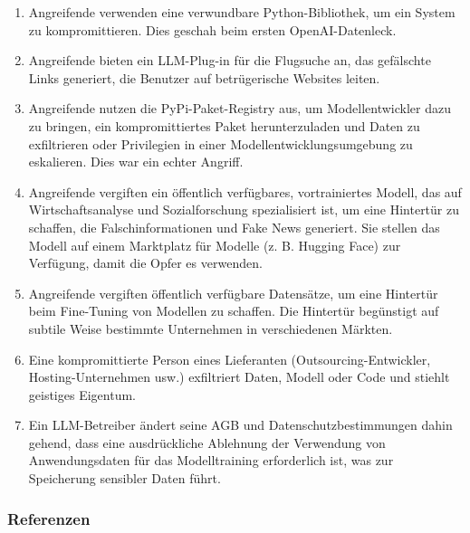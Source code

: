 \documentclass[
]{article}
\providecommand{\tightlist}{%
  \setlength{\itemsep}{0pt}\setlength{\parskip}{0pt}}
\begin{document}
\begin{enumerate}
\def\labelenumi{\arabic{enumi}.}
\tightlist
\item
  Angreifende verwenden eine verwundbare Python-Bibliothek, um ein
  System zu kompromittieren. Dies geschah beim ersten OpenAI-Datenleck.
\item
  Angreifende bieten ein LLM-Plug-in für die Flugsuche an, das
  gefälschte Links generiert, die Benutzer auf betrügerische Websites
  leiten.
\item
  Angreifende nutzen die PyPi-Paket-Registry aus, um Modellentwickler
  dazu zu bringen, ein kompromittiertes Paket herunterzuladen und Daten
  zu exfiltrieren oder Privilegien in einer Modellentwicklungsumgebung
  zu eskalieren. Dies war ein echter Angriff.
\item
  Angreifende vergiften ein öffentlich verfügbares, vortrainiertes
  Modell, das auf Wirtschaftsanalyse und Sozialforschung spezialisiert
  ist, um eine Hintertür zu schaffen, die Falschinformationen und Fake
  News generiert. Sie stellen das Modell auf einem Marktplatz für
  Modelle (z. B. Hugging Face) zur Verfügung, damit die Opfer es
  verwenden.
\item
  Angreifende vergiften öffentlich verfügbare Datensätze, um eine
  Hintertür beim Fine-Tuning von Modellen zu schaffen. Die Hintertür
  begünstigt auf subtile Weise bestimmte Unternehmen in verschiedenen
  Märkten.
\item
  Eine kompromittierte Person eines Lieferanten (Outsourcing-Entwickler,
  Hosting-Unternehmen usw.) exfiltriert Daten, Modell oder Code und
  stiehlt geistiges Eigentum.
\item
  Ein LLM-Betreiber ändert seine AGB und Datenschutzbestimmungen dahin
  gehend, dass eine ausdrückliche Ablehnung der Verwendung von
  Anwendungsdaten für das Modelltraining erforderlich ist, was zur
  Speicherung sensibler Daten führt.
\end{enumerate}

\subsubsection{Referenzen}\label{referenzen}
\end{document}
